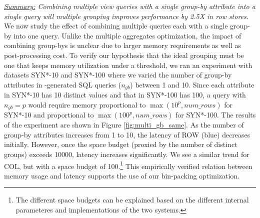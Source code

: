 
{\em \underline{Summary:} Combining multiple view queries with a single group-by attribute into a single query will multiple
grouping improves performance by 2.5X in row stores.}
We now study the effect of combining multiple queries each with a single group-by into one query.
Unlike the multiple aggregates optimization, the impact of combining group-bys
is unclear due to larger memory requirements as well as post-processing cost.
To verify our hypothesis that the ideal grouping must be one that keeps memory utilization
under a threshold, we ran an experiment with datasets SYN*-10 and SYN*-100 where
we varied the number of group-by attributes in \SeeDB-generated SQL queries ($n_{gb}$) 
between 1 and 10.
Since each attribute in SYN*-10 has 10 distinct values and that in SYN*-100
has 100, a query with $n_{gb}=p$ would require memory proportional to $\max(10^p,
num\_rows)$ for SYN*-10 and proportional to $\max(100^p, num\_rows)$ for SYN*-100.
The results of the experiment are shown in Figure \ref{fig:multi_gb_same}.
As the number of group-by attributes increases from 1 to 10, the latency of ROW (blue) decreases initially.
However, once the space budget (proxied by the number of distinct groups) exceeds 10000, latency increases significantly. 
We see a similar trend for COL, but with a space budget of 100.\footnote{The different space
budgets can be explained based on the different internal parameteres and implementations of
the two systems.}
This empirically verified relation between memory usage and latency supports the use of 
our bin-packing optimization.


